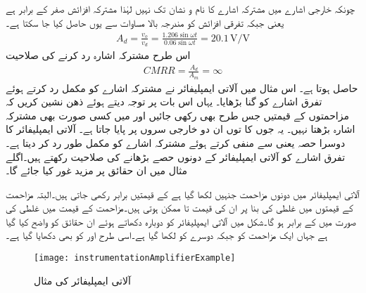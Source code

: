 چونکہ خارجی اشارے میں مشترکہ اشارے کا نام و نشان تک نہیں لہٰذا مشترکہ افزائش صفر کے برابر ہے یعنی  جبکہ تفرقی افزائش کو مندرجہ بالا مساوات سے یوں حاصل کیا جا سکتا ہے۔
\begin{align*}
A_d=\frac{v_o}{v_d}=\frac{1.206 \sin \omega t}{0.06 \sin \omega t}=20.1 \, \si{\volt\per\volt}
\end{align*}
اس طرح مشترکہ اشارہ رد کرنے کی صلاحیت
\begin{align*}
CMRR=\frac{A_d}{A_m}=\infty
\end{align*}
حاصل ہوتا ہے۔
اس مثال میں آلاتی ایمپلیفائر نے مشترکہ اشارے کو مکمل رد کرتے ہوئے تفرق اشارے کو  گنا بڑھایا۔ یہاں اس بات پر توجہ دیتے ہوئے ذھن نشین کریں کہ مزاحمتوں کے قیمتیں جس طرح بھی رکھی جائیں  اور  میں کسی صورت بھی مشترکہ اشارہ بڑھتا نہیں۔ یہ جوں کا توں ان دو خارجی سروں  پر پایا جاتا ہے۔ آلاتی ایمپلیفائر کا دوسرا حصہ یعنی   سے  منفی کرتے ہوئے مشترکہ اشارے کو مکمل طور رد کر دیتا ہے۔ تفرق اشارے کو آلاتی ایمپلیفائر کے دونوں حصے بڑھانے کی صلاحیت رکھتے ہیں۔اگلے مثال میں ان حقائق پر مزید غور کیا جائے گا۔

آلاتی ایمپلیفائر میں دونوں مزاحمت جنہیں  لکھا گیا ہے کے قیمتیں برابر رکھی جاتی ہیں۔البتہ مزاحمت کے قیمتوں میں غلطی کی بنا پر ان کی قیمت
  تا   ممکن ہوتی ہیں۔مزاحمت کے قیمت میں  غلطی کی صورت میں  کے برابر ہو گا۔شکل  میں آلاتی ایمپلیفائر کو دوبارہ دکھاتے ہوئے ان حقائق کو واضح کیا گیا ہے جہاں ایک مزاحمت کو  جبکہ دوسرے کو  لکھا گیا ہے۔اسی طرح اور  کو بھی دکھایا گیا ہے۔
\begin{figure}
\centering
\texttt{[image: instrumentationAmplifierExample]}
\caption{آلاتی ایمپلیفائر کی مثال}
\label{شکل_آلاتی_ایمپلیفائر_مثال}
\end{figure}

